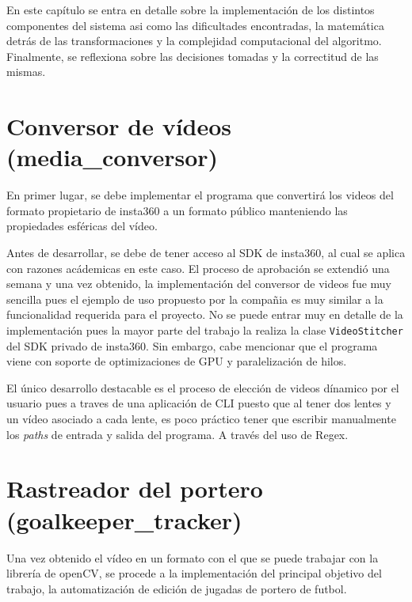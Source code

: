 En este capítulo se entra en detalle sobre la implementación de los distintos componentes del sistema asi como las dificultades encontradas, la matemática detrás de las transformaciones y la complejidad computacional del algoritmo. Finalmente, se reflexiona sobre las decisiones tomadas y la correctitud de las mismas.

\section{Conversor de vídeos (media\_conversor)}

En primer lugar, se debe implementar el programa que convertirá los videos del formato propietario de insta360 a un formato público manteniendo las propiedades esféricas del vídeo.

Antes de desarrollar, se debe de tener acceso al SDK de insta360, al cual se aplica con razones acádemicas en este caso. El proceso de aprobación se extendió una semana y una vez obtenido, la implementación del conversor de videos fue muy sencilla pues el ejemplo de uso propuesto por la compañia es muy similar a la funcionalidad requerida para el proyecto. No se puede entrar muy en detalle de la implementación pues la mayor parte del trabajo la realiza la clase \verb|VideoStitcher| del SDK privado de insta360. Sin embargo, cabe mencionar que el programa viene con soporte de optimizaciones de GPU y paralelización de hilos.

El único desarrollo destacable es el proceso de elección de videos dínamico por el usuario pues a traves de una aplicación de CLI puesto que al tener dos lentes y un vídeo asociado a cada lente, es poco práctico tener que escribir manualmente los \textit{paths} de entrada y salida del programa. A través del uso de Regex.


\vspace{60px}

\section{Rastreador del portero (goalkeeper\_tracker)}

Una vez obtenido el vídeo en un formato con el que se puede trabajar con la librería de openCV, se procede a la implementación del principal objetivo del trabajo, la automatización de edición de jugadas de portero de futbol.

